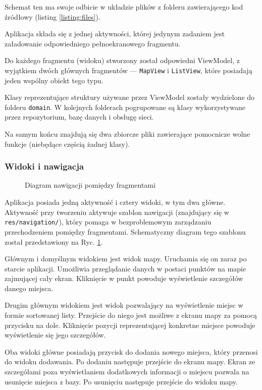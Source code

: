 \documentclass[polish,polish,a4paper,12pt]{article}
\begin{document}
		Schemat ten ma swoje odbicie w układzie plików z folderu zawierającego kod źródłowy (listing \ref{listing:files}).

		Aplikacja składa się z jednej aktywności, której jedynym zadaniem jest załadowanie odpowiedniego pełnoekranowego fragmentu.

		Do każdego fragmentu (widoku) stworzony został odpowiedni ViewModel, z wyjątkiem dwóch głównych fragmentów — \texttt{MapView} i \texttt{ListView}, które posiadają jeden wspólny obiekt tego typu.

		Klasy reprezentujące struktury używane przez ViewModel zostały wydzielone do folderu \texttt{domain}. W kolejnych folderach pogrupowane są klasy wykorzystywane przez repozytorium, bazę danych i obsługę sieci.

		Na samym końcu znajdują się dwa zbiorcze pliki zawierające pomocnicze wolne funkcje (niebędące częścią żadnej klasy).


		\subsubsection{Widoki i nawigacja}

		\begin{figure}[H]
			\centering
			{\scriptsize
				
			}
			\caption{Diagram nawigacji pomiędzy fragmentami}
			\label{fig:navigation}
		\end{figure}

		Aplikacja posiada jedną aktywność i cztery widoki, w tym dwa główne. Aktywność przy tworzeniu aktywuje szablon nawigacji (znajdujący się w \texttt{res/navigation/}), który pomaga w bezproblemowym zarządzaniu przechodzeniem pomiędzy fragmentami. Schematyczny diagram tego szablonu został przedstawiony na Ryc. \ref{fig:navigation}.

		Głównym i domyślnym widokiem jest widok mapy. Uruchamia się on zaraz po starcie aplikacji. Umożliwia przeglądanie danych w postaci punktów na mapie zajmującej cały ekran. Kliknięcie w punkt powoduje wyświetlenie szczegółów danego miejsca.

		Drugim głównym widokiem jest widok pozwalający na wyświetlenie miejsc w formie sortowanej listy. Przejście do niego jest możliwe z ekranu mapy za pomocą przycisku na dole. Kliknięcie pozycji reprezentującej konkretne miejsce powoduje wyświetlenie się jego szczegółów.

		Oba widoki główne posiadają przycisk do dodania nowego miejsca, który przenosi do widoku dodawania. Po dodaniu następuje przejście do ekranu mapy. Ekran ze szczegółami poza wyświetlaniem dodatkowych informacji o miejscu pozwala na usunięcie miejsca z bazy. Po usunięciu następuje przejście do widoku mapy.
\end{document}
